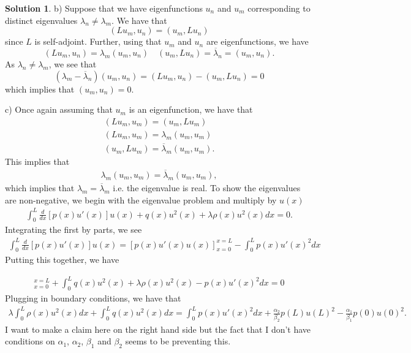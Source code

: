 \documentclass[12pt]{article}
\theoremstyle{definition}
\newtheorem{sol}{Solution}
\theoremstyle{remark}
\begin{document}
\begin{sol}
    b) Suppose that we have eigenfunctions $u_{n}$ and $u_{m}$ corresponding to distinct eigenvalues $\lambda_{n} \neq \lambda_{m}$. We have that
    \begin{equation*}
        (Lu_{m}, u_{n}) = (u_{m}, Lu_{n})
    \end{equation*}
    since $L$ is self-adjoint. Further, using that $u_{m}$ and $u_{n}$ are eigenfunctions, we have
\begin{equation*}
    (Lu_{m}, u_{n}) = \lambda_{m} (u_{m}, u_{n}) \quad (u_{m}, Lu_{n}) = \overline{\lambda}_{n} = (u_{m}, u_{n}).
\end{equation*}
As $\lambda_{n} \neq \lambda_{m}$, we see that
\begin{equation*}
    (\lambda_{m} - \overline{\lambda}_{n})(u_{m}, u_{n}) =  (Lu_{m}, u_{n}) - (u_{m}, Lu_{n}) =  0
\end{equation*}
which implies that $(u_{m}, u_{n}) = 0$.

\newpage

    c) Once again assuming that $u_{m}$ is an eigenfunction, we have that
    \begin{align*}
    (Lu_{m}, u_{m}) = (u_{m}, Lu_{m})\\
    (Lu_{m}, u_{m}) = \lambda_{m} (u_{m}, u_{m})\\
    (u_{m}, Lu_{m}) = \overline{\lambda}_{m} (u_{m}, u_{m}).
    \end{align*}
    This implies that 
    \begin{align*}
     \lambda_{m} (u_{m}, u_{m}) =\overline{\lambda}_{m} (u_{m}, u_{m}),
    \end{align*}
    which implies that $\lambda_{m} = \overline{\lambda}_{m}$ i.e. the eigenvalue is real. To show the eigenvalues are non-negative, we begin with the eigenvalue problem and multiply by $u(x)$
\begin{align*}
    \int_{0}^{L} \frac{d}{dx}\left[p(x) u'(x)\right] u(x) + q(x) u^{2}(x) + \lambda \rho(x) u^{2}(x) dx = 0.
\end{align*}
Integrating the first by parts, we see
\begin{align*}
\int_{0}^{L} \frac{d}{dx}\left[p(x) u'(x)\right] u(x) 
= [ p(x) u'(x) u(x) ]_{x=0}^{x=L} - 
\int_{0}^{L} p(x) u'(x)^{2}dx
\end{align*}
Putting this together, we have

\begin{align*}
[ p(x) u'(x) u(x) ]_{x=0}^{x=L} +
\int_{0}^{L} q(x) u^{2}(x) + \lambda \rho(x) u^{2}(x) - p(x) u'(x)^{2}dx = 0
\end{align*}
Plugging in boundary conditions, we have that
\begin{align*}
    \lambda \int_{0}^{L} \rho(x) u^{2}(x)dx + \int_{0}^{L} q(x) u^{2}(x)dx = \int_{0}^{L} p(x) u'(x)^{2}  dx +  \frac{\alpha_{2}}{\beta_{2}}p(L) u(L)^{2} - \frac{\alpha_{1}}{\beta_{1}} p(0) u(0)^{2}.
\end{align*}
I want to make a claim here on the right hand side but the fact that I don't have conditions on $\alpha_{1}$, $\alpha_{2}$, $\beta_{1}$ and $\beta_{2}$ seems to be preventing this.


\end{sol}
\end{document}
